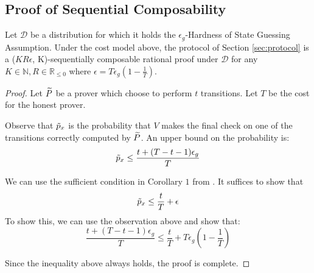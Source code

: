 \subsection{Proof of Sequential Composability}


\begin{theorem}
Let $\mathcal{D}$ be a distribution for which it holds the $\epsilon_g$-Hardness of State Guessing Assumption. Under the cost model above, the protocol of Section  \ref{sec:protocol} is a ($KR\epsilon$, K)-sequentially composable rational proof under $\mathcal{D}$ for any $K \in \mathbb{N}, R \in \mathbb{R}_{\leq 0}$ where $\epsilon = T\epsilon_g(1 - \frac{1}{T})$.
\end{theorem}
\begin{proof}

Let $\widetilde{P}$ be a prover which choose to perform $t$ transitions.
Let $T$ be the cost for the honest prover.

Observe that $\tilde{p}_x$ is the probability that $V$ makes the final check on one of the transitions correctly computed by $\widetilde{P}$. An upper bound on the probability is:
$$ \tilde{p}_x \leq \frac{t + (T-t-1)\epsilon_g}{T}$$

We can use the sufficient condition in Corollary $1$ from \cite{cg15}.
It suffices to show that 
$$\tilde{p}_x \leq \frac{t}{T} + \epsilon$$
To show this, we can use the observation above and show that:
$$ \frac{t + (T-t-1)\epsilon_g}{T}  \leq \frac{t}{T} + T\epsilon_g(1 - \frac{1}{T}) $$

Since the inequality above always holds, the proof is complete.
\end{proof}